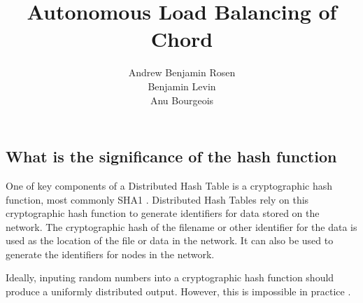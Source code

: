 \documentclass[11pt,letterpaper]{article}
\title{Autonomous Load Balancing of Chord}
\author{Andrew Benjamin Rosen \\ Benjamin Levin \\ Anu Bourgeois}
\date{}
\begin{document}
\maketitle







%

\subsection*{What is the significance of the hash function }
One of key components of a Distributed Hash Table is a cryptographic hash function, most commonly SHA1 \cite{sha1}.
Distributed Hash Tables rely on this cryptographic hash function to generate identifiers for data stored on the network.
The cryptographic hash of the filename or other identifier for the data is used as the location of the file or data in the network.
It can also be used to generate the identifiers for nodes in the network.

Ideally, inputing random numbers into a cryptographic hash function should produce a uniformly distributed output.
However, this is impossible in practice \cite{hash-outputs} \cite{thomsen2005cryptographic}.
\end{document}

